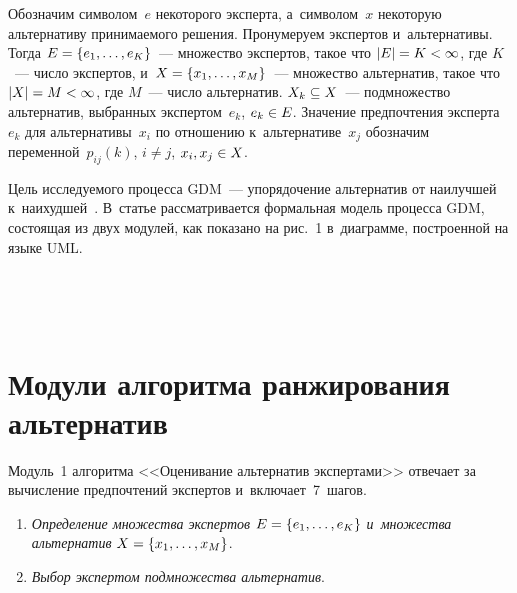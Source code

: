 \begin{multicols}{2}
  Обозначим символом~$e$ некоторого эксперта, а~символом~$x$ некоторую 
альтернативу принимаемого решения. Пронумеруем экспертов и~альтернативы. 
Тогда ${{E}}\hm= \{ e_1,\ldots , e_K\}$~--- множество экспертов, такое что 
$\vert {E}\vert \hm=K\hm<\infty$, где $K$~--- число экспертов, и~${X}\hm= 
\{x_1, \ldots ,x_M\}$~--- множество альтернатив, такое что $\vert {X}\vert 
\hm=M\hm<\infty$, где $M$~--- число альтернатив. $X_k\hm\subseteq X$~--- 
подмножество альтернатив, выбранных экспертом~$e_k$, $e_k\hm\in E$. 
Значение предпочтения эксперта~$e_k$ для альтернативы~$x_i$ по отношению 
к~альтернативе~$x_j$ обозначим переменной~$p_{ij}(k)$, $i\not=j$,  $x_i, 
x_j\hm\in X$.
  
  Цель исследуемого процесса GDM~--- упорядочение альтернатив от 
наилучшей к~наихудшей~\cite{4-gai}. В~статье рассматривается формальная 
модель процесса GDM, состоящая из двух модулей, как показано на рис.~1 
в~диаграмме, построенной на языке UML. 
  
\begin{figure*} %
   \vspace*{1pt}
    \begin{center}  
  \mbox{%
 \epsfxsize=156.612mm 
 }
\end{center}
\vspace*{-9pt}
\end{figure*}

   \begin{figure*}[b] %
      \vspace*{1pt}
    \begin{center}  
  \mbox{%
 \epsfxsize=77.522mm 
 }
\end{center}
\vspace*{-9pt}
\end{figure*}

\section{Модули алгоритма ранжирования альтернатив}

Модуль~1 алгоритма <<Оценивание альтернатив экспертами>> отвечает за 
вычисление предпочтений экспертов и~включает~7~шагов.
\begin{enumerate}[1.]
\item \textit{Определение множества экспертов $E\hm= \{ e_1,\ldots , e_K\}$ 
и~множества альтернатив} $X\hm= \{ x_1,\ldots ,x_M\}$.
\item \textit{Выбор экспертом подмножества альтернатив}. 


\end{enumerate}
\end{multicols}
